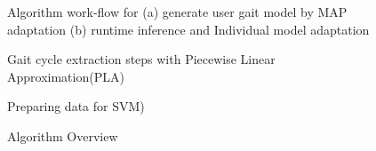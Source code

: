 \documentclass{sig-alternate}
\begin{document}
\begin{figure}
\centering
{}
\caption{Algorithm work-flow for (a) generate user gait model by MAP adaptation (b) runtime inference and Individual model adaptation}
\label{fig:TD2}
\end{figure}

\begin{figure}
\centering
{}
\caption{Gait cycle extraction steps with Piecewise Linear Approximation(PLA)}
\label{fig:AddedStep}
\end{figure}

\begin{figure}
\centering
{}
\caption{Preparing data for SVM)}
\label{fig:TrainingData}
\end{figure}



\begin{figure*}
\centering
{}
\caption{Algorithm Overview}
\label{fig:Paper2Summary}
\end{figure*}

%
%
\end{document}
